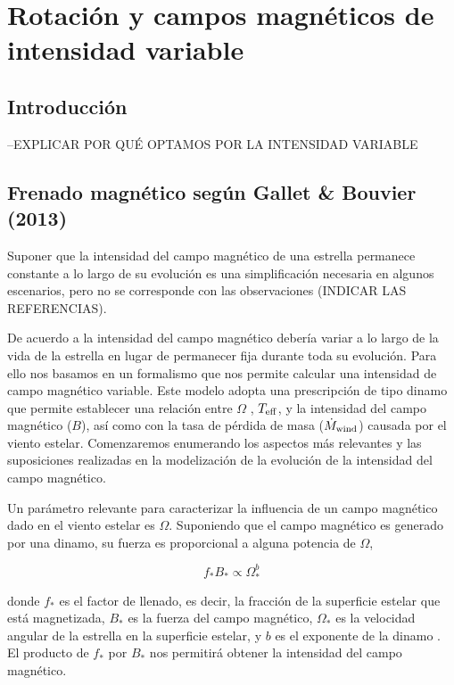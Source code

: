 \chapter{Rotación y campos magnéticos de intensidad variable}\label{ch:sexto-capitulo}

\section{Introducción}
--EXPLICAR POR QUÉ OPTAMOS POR LA INTENSIDAD VARIABLE

\section{Frenado magnético según Gallet \& Bouvier (2013)}
Suponer que la intensidad del campo magnético de una estrella permanece constante a lo largo de su evolución es una simplificación necesaria en algunos escenarios, pero no se corresponde con las observaciones (INDICAR LAS REFERENCIAS). \par

De acuerdo a \cite{Gallet2013} la intensidad del campo magnético debería variar a lo largo de la vida de la estrella en lugar de permanecer fija durante toda su evolución. Para ello nos basamos en un formalismo que nos permite calcular una intensidad de campo magnético variable. Este modelo adopta una prescripción de tipo dinamo que permite establecer una relación entre $\Omega$ , $T_{\mathrm{eff}}$, y la intensidad del campo magnético ($B$), así como con la tasa de pérdida de masa ($\Dot{M}_{\mathrm{wind}}$) causada por el viento estelar. Comenzaremos enumerando los aspectos más relevantes y las suposiciones realizadas en la modelización de la evolución de la intensidad del campo magnético.\par 

Un parámetro relevante para caracterizar la influencia de un campo magnético dado en el viento estelar es $\Omega$. Suponiendo que el campo magnético es generado por una dinamo, su fuerza es proporcional a alguna potencia de $\Omega$,

\begin{ceqn}
	\begin{equation}
		f_*B_* \propto \Omega_*^b \label{eq:mf_strenght}
	\end{equation}
\end{ceqn}

donde $f_*$ es el factor de llenado, es decir, la fracción de la superficie estelar que está magnetizada, $B_*$ es la fuerza del campo magnético, $\Omega_*$ es la velocidad angular de la estrella en la superficie estelar, y $b$ es el exponente de la dinamo \cite{Gallet2013}. El producto de $f_*$ por $B_*$ nos permitirá obtener la intensidad del campo magnético. \par

